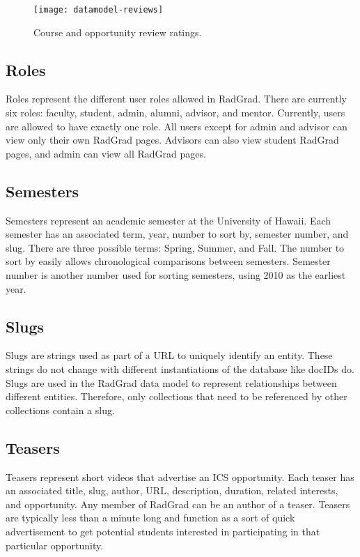 \begin{figure}[h]
\centering
\texttt{[image: datamodel-reviews]}
\caption{Course and opportunity review ratings.}
\end{figure}

\subsection{Roles}
Roles represent the different user roles allowed in RadGrad. There are currently six roles: faculty, student, admin, alumni, advisor, and mentor. Currently, users are allowed to have exactly one role. All users except for admin and advisor can view only their own RadGrad pages. Advisors can also view student RadGrad pages, and admin can view all RadGrad pages. 

\subsection{Semesters}
Semesters represent an academic semester at the University of Hawaii. Each semester has an associated term, year, number to sort by, semester number, and slug. There are three possible terms: Spring, Summer, and Fall. The number to sort by easily allows chronological comparisons between semesters. Semester number is another number used for sorting semesters, using 2010 as the earliest year. 

\subsection{Slugs}
Slugs are strings used as part of a URL to uniquely identify an entity. These strings do not change with different instantiations of the database like docIDs do. Slugs are used in the RadGrad data model to represent relationships between different entities. Therefore, only collections that need to be referenced by other collections contain a slug. 

\subsection{Teasers}
Teasers represent short videos that advertise an ICS opportunity. Each teaser has an associated title, slug, author, URL, description, duration, related interests, and opportunity. Any member of RadGrad can be an author of a teaser. Teasers are typically less than a minute long and function as a sort of quick advertisement to get potential students interested in participating in that particular opportunity. 

